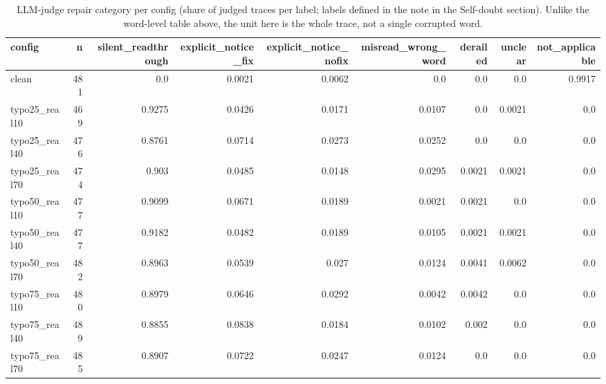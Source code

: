 \documentclass[11pt]{article}
\begin{document}
\begin{table}[H]
\centering
\caption{LLM-judge repair category per config (share of judged traces per label; labels defined in the note in the Self-doubt section). Unlike the word-level table above, the unit here is the whole trace, not a single corrupted word.}
\small
\begin{adjustbox}{max width=\textwidth}
\begin{tabular}{lrrrrrrrr}
\toprule
\textbf{config} & \textbf{n} & \textbf{silent\_readthrough} & \textbf{explicit\_notice\_fix} & \textbf{explicit\_notice\_nofix} & \textbf{misread\_wrong\_word} & \textbf{derailed} & \textbf{unclear} & \textbf{not\_applicable} \\
\midrule
clean & 481 & 0.0 & 0.0021 & 0.0062 & 0.0 & 0.0 & 0.0 & 0.9917 \\
typo25\_real10 & 469 & 0.9275 & 0.0426 & 0.0171 & 0.0107 & 0.0 & 0.0021 & 0.0 \\
typo25\_real40 & 476 & 0.8761 & 0.0714 & 0.0273 & 0.0252 & 0.0 & 0.0 & 0.0 \\
typo25\_real70 & 474 & 0.903 & 0.0485 & 0.0148 & 0.0295 & 0.0021 & 0.0021 & 0.0 \\
typo50\_real10 & 477 & 0.9099 & 0.0671 & 0.0189 & 0.0021 & 0.0021 & 0.0 & 0.0 \\
typo50\_real40 & 477 & 0.9182 & 0.0482 & 0.0189 & 0.0105 & 0.0021 & 0.0021 & 0.0 \\
typo50\_real70 & 482 & 0.8963 & 0.0539 & 0.027 & 0.0124 & 0.0041 & 0.0062 & 0.0 \\
typo75\_real10 & 480 & 0.8979 & 0.0646 & 0.0292 & 0.0042 & 0.0042 & 0.0 & 0.0 \\
typo75\_real40 & 489 & 0.8855 & 0.0838 & 0.0184 & 0.0102 & 0.002 & 0.0 & 0.0 \\
typo75\_real70 & 485 & 0.8907 & 0.0722 & 0.0247 & 0.0124 & 0.0 & 0.0 & 0.0 \\
\bottomrule
\end{tabular}
\end{adjustbox}
\end{table}
\end{document}
